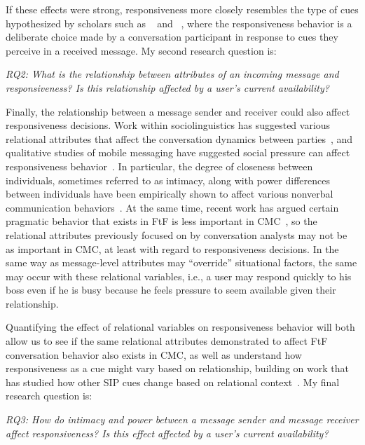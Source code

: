 \documentclass[12pt]{nuthesis}	%
\begin{document}
If these effects were strong, responsiveness more closely resembles the type of cues hypothesized by scholars such as ~\citet{walther1995nonverbal} and ~\citet{kalman2006pauses}, where the responsiveness behavior is a deliberate choice made by a conversation participant in response to cues they perceive in a received message. My second research question is:

\textit{RQ2: What is the relationship between attributes of an incoming message and responsiveness? Is this relationship affected by a user's current availability?}

Finally, the relationship between a message sender and receiver could also affect responsiveness decisions. Work within sociolinguistics has suggested various relational attributes that affect the conversation dynamics between parties~\citep{brown1987politeness,goldberg1990interrupting,west1979against,wolfson1990bulge}, and qualitative studies of mobile messaging have suggested social pressure can affect responsiveness behavior~\citep{church2013s,laursen2005please,tjora2011invisible,weilenmann2003can}. In particular, the degree of closeness between individuals, sometimes referred to as intimacy, along with power differences between individuals have been empirically shown to affect various nonverbal communication behaviors~\citep{guerrero1991waxing,henley1973power,leffler1982effects,sternglanz2004reading}.  At the same time, recent work has argued certain pragmatic behavior that exists in FtF is less important in CMC~\citep{schulze2017knowledge,stromer2015context}, so the relational attributes previously focused on by conversation analysts may not be as important in CMC, at least with regard to responsiveness decisions. In the same way as message-level attributes may ``override'' situational factors, the same may occur with these relational variables, i.e., a user may respond quickly to his boss even if he is busy because he feels pressure to seem available given their relationship.

Quantifying the effect of relational variables on responsiveness behavior will both allow us to see if the same relational attributes demonstrated to affect FtF conversation behavior also exists in CMC, as well as understand how responsiveness as a cue might vary based on relationship, building on work that has studied how other SIP cues change based on relational context~\citep[e.g.,][]{hancock2007expressing}. My final research question is:

\textit{RQ3: How do intimacy and power between a message sender and message receiver affect responsiveness? Is this effect affected by a user's current availability?}
\end{document}
